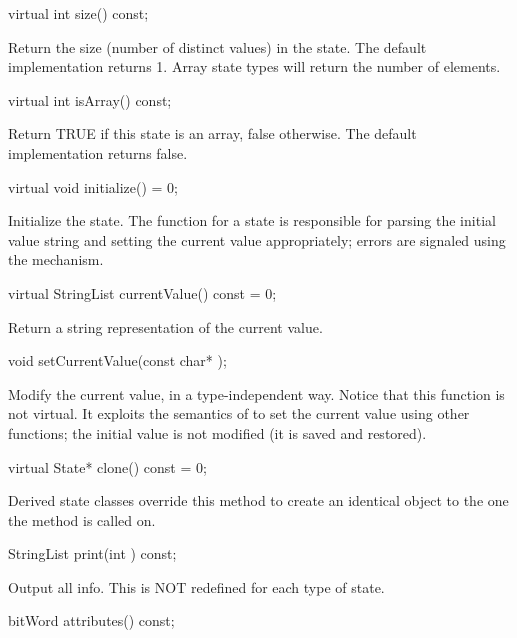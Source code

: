 \begin{example}
virtual int size() const;
\end{example}

Return the size (number of distinct values) in the state.  The
default implementation returns 1.  Array state types will return the
number of elements.

\begin{example}
virtual int isArray() const;
\end{example}

Return TRUE if this state is an array, false otherwise.  The default
implementation returns false.

\begin{example}
virtual void initialize() = 0;
\end{example}

Initialize the state.  The  function for a state is
responsible for parsing the initial value string and setting the current
value appropriately; errors are signaled using the
 mechanism.

\begin{example}
virtual StringList currentValue() const = 0;
\end{example}

Return a string representation of the current value.

\begin{example}
void setCurrentValue(const char* );
\end{example}

Modify the current value, in a type-independent way.  Notice that this
function is not virtual.  It exploits the semantics of 
to set the current value using other functions; the initial value is
not modified (it is saved and restored).

\begin{example}
virtual State* clone() const = 0;
\end{example}

Derived state classes override this method to create an identical
object to the one the method is called on.

\begin{example}
StringList print(int ) const;
\end{example}

Output all info.  This is NOT redefined for each type of state.

\begin{example}
bitWord attributes() const;
\end{example}

